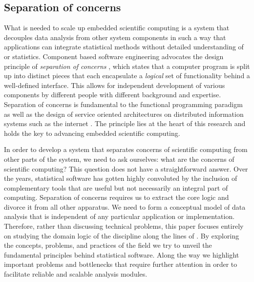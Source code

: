 \subsection{Separation of concerns}

What is needed to scale up embedded scientific computing is a system that decouples data analysis from other system components in such a way that applications can integrate statistical methods without detailed understanding of \R or statistics. Component based software engineering advocates the design principle of \emph{separation of concerns} \citep{heineman2001component}, which states that a computer program is split up into distinct pieces that each encapsulate a \emph{logical} set of functionality behind a well-defined interface. This allows for independent development of various components by different people with different background and expertise. Separation of concerns is fundamental to the functional programming paradigm \citep{reade1989elements} as well as the design of service oriented architectures on distributed information systems such as the internet \citep{fielding2000architectural}. The principle lies at the heart of this research and holds the key to advancing embedded scientific computing.

In order to develop a system that separates concerns of scientific computing from other parts of the system, we need to ask ourselves: what are the concerns of scientific computing? This question does not have a straightforward answer. Over the years, statistical software has gotten highly convoluted by the inclusion of complementary tools that are useful but not necessarily an integral part of computing. Separation of concerns requires us to extract the core logic and divorce it from all other apparatus. We need to form a conceptual model of data analysis that is independent of any particular application or implementation. Therefore, rather than discussing technical problems, this paper focuses entirely on studying the domain logic of the discipline along the lines of \cite{evans2004domain}. By exploring the concepts, problems, and practices of the field we try to unveil the fundamental principles behind statistical software. Along the way we highlight important problems and bottlenecks that require further attention in order to facilitate reliable and scalable analysis modules.

